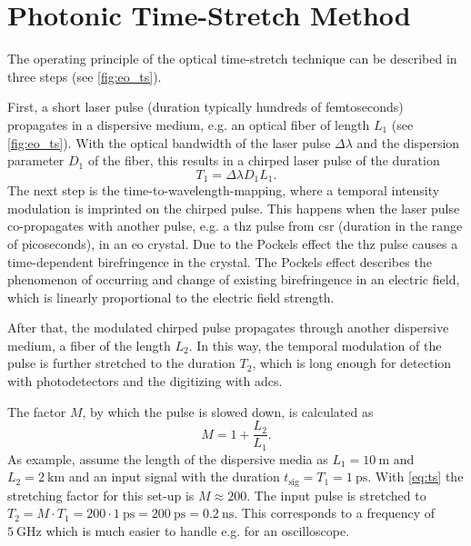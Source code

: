 \section{Photonic Time-Stretch Method}
The operating principle of the optical time-stretch technique can be described in three steps (see \autoref{fig:eo_ts}).

First, a short laser pulse (duration typically hundreds of femtoseconds) propagates in a dispersive medium, e.g. an optical fiber of length $L_1$ (see \autoref{fig:eo_ts}).
With the optical bandwidth of the laser pulse $\Delta \lambda$ and the dispersion parameter $D_1$ of the fiber, this results in a chirped laser pulse of the duration
\begin{equation}
	T_1 = \Delta \lambda D_1 L_1.
\end{equation}
The next step is the time-to-wavelength-mapping, where a temporal intensity modulation is imprinted on the chirped pulse.
This happens when the laser pulse co-propagates with another pulse, e.g. a \gls{thz} pulse from \gls{csr} (duration in the range of picoseconds), in an \gls{eo} crystal. 
Due to the Pockels effect the \gls{thz} pulse causes a time-dependent birefringence in the crystal. 
The Pockels effect describes the phenomenon of occurring and change of existing birefringence in an electric field, which is linearly proportional to the electric field strength. \cite{pockels} 

After that, the modulated chirped pulse propagates through another dispersive medium, a fiber of the length $L_2$.
In this way, the temporal modulation of the pulse is further stretched to the duration $T_2$, which is long enough for detection with photodetectors and the digitizing with \Glspl{adc}. \cite{roussel2014} 

The factor $M$, by which the pulse is slowed down, is calculated as
\begin{equation}\label{eq:ts}
	M = 1 + \frac{L_2}{L_1}.
\end{equation}
As example, assume the length of the dispersive media as $L_1 = \SI{10}{\meter}$ and $L_2 = \SI{2}{\kilo \meter}$ and an input signal with the duration $t_\text{sig} = T_1 = \SI{1}{\pico \second}$. 
With \autoref{eq:ts} the stretching factor for this set-up is $M \approx 200$. The input pulse is stretched to $T_2 = M \cdot T_1 = 200 \cdot \SI{1}{\pico \second} = \SI{200}{\pico \second} = \SI{0.2}{\nano \second}$.
This corresponds to a frequency of $\SI{5}{\GHz}$ which is much easier to handle e.g. for an oscilloscope.

